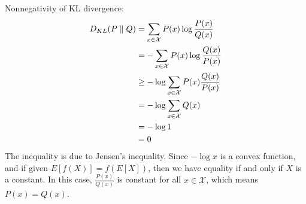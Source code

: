 \begin{answer}
    Nonnegativity of KL divergence:
    \begin{align*}
        D_{KL}(P \parallel Q) &= \sum_{x \in \mathcal{X}} P(x) \log \frac{P(x)}{Q(x)} \\
        &= - \sum_{x \in \mathcal{X}} P(x) \log \frac{Q(x)}{P(x)} \\
        &\geq - \log \sum_{x \in \mathcal{X}} P(x) \frac{Q(x)}{P(x)} \\
        &= - \log \sum_{x \in \mathcal{X}} Q(x) \\
        &= - \log 1 \\
        &= 0
    \end{align*}
    The inequality is due to Jensen's inequality.
    Since $- \log x$ is a convex function, and if given $E[f(X)] = f(E[X])$,
    then we have equality if and only if $X$ is a constant. In this case,
    $\frac{P(x)}{Q(x)}$ is constant for all $x \in \mathcal{X}$, which means $P(x) = Q(x)$.
\end{answer}
